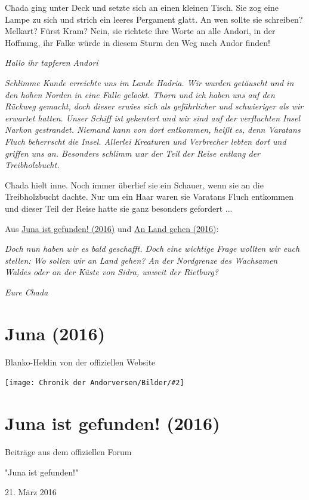 \documentclass[10pt, a4paper, oneside]{book}
\newcommand{\fillbreak}{\vspace*{\fill}\columnbreak}
\newcommand{\produkt}[1]{%
    \section{#1}%
    \label{Produkt: #1}%
}
\newcommand{\storytext}[1]{%
    \section{#1}%
    \label{Storytext: #1}%
}
\newcommand{\refstorytext}[1]{\hyperref[Storytext: #1]{#1}}
\newcommand{\bildmitts}[2][height=0.32\textwidth,width=0.48\textwidth,keepaspectratio]{%
    \begin{center}
        \texttt{[image: Chronik der Andorversen/Bilder/\#2]}
    \end{center}
}
\begin{document}
\begin{multicols}{2}
Chada ging unter Deck und setzte sich an einen kleinen Tisch. Sie zog eine Lampe zu sich und strich ein leeres Pergament glatt. An wen sollte sie schreiben? Melkart? Fürst Kram? Nein, sie richtete ihre Worte an alle Andori, in der Hoffnung, ihr Falke würde in diesem Sturm den Weg nach Andor finden!\bigskip

\textit{Hallo ihr tapferen Andori}

\textit{Schlimme Kunde erreichte uns im Lande Hadria. Wir wurden getäuscht und in den hohen Norden in eine Falle gelockt. Thorn und ich haben uns auf den Rückweg gemacht, doch dieser erwies sich als gefährlicher und schwieriger als wir erwartet hatten. Unser Schiff ist gekentert und wir sind auf der verfluchten Insel Narkon gestrandet. Niemand kann von dort entkommen, heißt es, denn Varatans Fluch beherrscht die Insel. Allerlei Kreaturen und Verbrecher lebten dort und griffen uns an. Besonders schlimm war der Teil der Reise entlang der Treibholzbucht.}\bigskip

Chada hielt inne. Noch immer überlief sie ein Schauer, wenn sie an die Treibholzbucht dachte. Nur um ein Haar waren sie Varatans Fluch entkommen und dieser Teil der Reise hatte sie ganz besonders gefordert ...

\begin{center}
    Aus \refstorytext{Juna ist gefunden! (2016)} und \refstorytext{An Land gehen (2016)}:
\end{center}

\textit{Doch nun haben wir es bald geschafft. Doch eine wichtige Frage wollten wir euch stellen: Wo sollen wir an Land gehen? An der Nordgrenze des Wachsamen Waldes oder an der Küste von Sidra, unweit der Rietburg?}

\textit{Eure Chada}



\fillbreak
\produkt{Juna (2016)}

\begin{center}
    Blanko-Heldin von der offiziellen Website
\end{center}


\bildmitts{AA2016 Chadas Brief 1.jpeg}



\storytext{Juna ist gefunden! (2016)}

\begin{center}
    Beiträge aus dem offiziellen Forum

    "Juna ist gefunden!"

    21. März 2016
\end{center}


\end{multicols}
\end{document}
